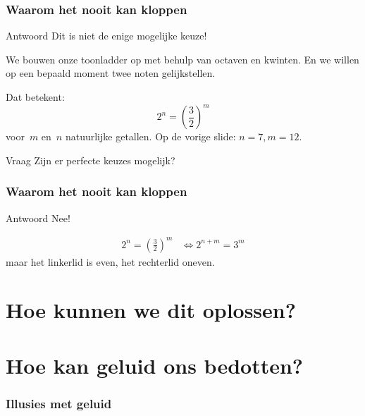 \documentclass[compress, darktitle, framenumber, totalframenumber]{beamer}
\begin{document}
\begin{frame}
  \frametitle{Waarom het nooit kan kloppen}

  \begin{block}{Antwoord}
    Dit is niet de enige mogelijke keuze!
  \end{block}
  We bouwen onze toonladder op met behulp van octaven en kwinten. En we willen op een bepaald moment twee noten gelijkstellen.

  \pause
  Dat betekent:
  \begin{equation}
    2^n=\left( \frac{3}{2} \right)^m
  \end{equation}
  voor~$m$ en~$n$ natuurlijke getallen. Op de vorige slide: $n=7,m=12$.
  \pause
  \begin{alertblock}{Vraag}
    Zijn er perfecte keuzes mogelijk?
  \end{alertblock}
\end{frame}

\begin{frame}
  \frametitle{Waarom het nooit kan kloppen}

  \begin{block}{Antwoord}
    Nee!
  \end{block}
  \pause
  \begin{equation}
    \begin{aligned}
      2^n=\left( \frac{3}{2} \right)^m&\Longleftrightarrow 2^{n+m}=3^m
    \end{aligned}
  \end{equation}
  maar het linkerlid is even, het rechterlid oneven.
\end{frame}

\section{Hoe kunnen we dit oplossen?}

\section{Hoe kan geluid ons bedotten?}
\begin{frame}
  \frametitle{Illusies met geluid}

  \centering
\end{frame}
\end{document}
